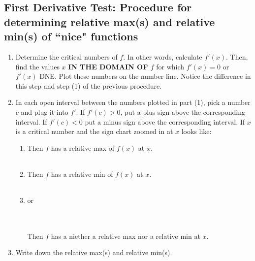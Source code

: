 \documentclass[reqno,psamsfonts]{amsart}
\theoremstyle{definition}
\theoremstyle{remark}
\numberwithin{equation}{section}
\begin{document}
\subsection*{First Derivative Test: Procedure for determining relative max(s) and relative min(s) of ``nice" functions}
\begin{enumerate}
\item Determine the critical numbers of $f$. In other words, calculate $f'(x)$. Then, find the values $x$ \textbf{IN THE DOMAIN OF $f$} for which $f'(x) =0$ or $f'(x)$ DNE. Plot these numbers on the number line. Notice the difference in this step and step (1) of the previous procedure. 
\\
\item In each open interval between the numbers plotted in part (1), pick a number $c$ and plug it into $f'$. If $f'(c)>0$, put a plus sign above the corresponding interval. If $f'(c)<0$ put a minus sign above the corresponding interval. If $x$ is a critical number and the sign chart zoomed in at $x$ looks like:
\begin{enumerate}
\item 
\hspace{2em}
\hspace{2em}Then $f$ has a relative max of $f(x)$ at $x$.
\\
\\
\item \hspace{2em}
\hspace{2em}Then $f$ has a relative min of $f(x)$ at $x$.
\\
\\
\item \hspace{2em}
\hspace{2em} or\hspace{2em}
\\
\\Then $f$ has a niether a relative max nor a relative min at $x$.
\\
\end{enumerate}
\item Write down the relative max(s) and relative min(s). 
\end{enumerate}
\end{document}
